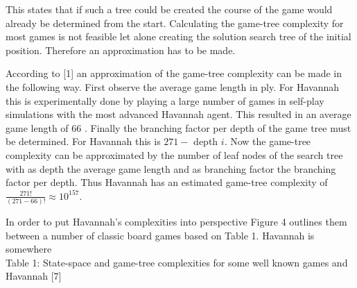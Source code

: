 \documentclass[10pt]{article}
\begin{document}
This states that if such a tree could be created the course of the game would already be determined from the start. Calculating the game-tree complexity for most games is not feasible let alone creating the solution search tree of the initial position. Therefore an approximation has to be made.

According to [1] an approximation of the game-tree complexity can be made in the following way. First observe the average game length in ply. For Havannah this is experimentally done by playing a large number of games in self-play simulations with the most advanced Havannah agent. This resulted in an average game length of 66 . Finally the branching factor per depth of the game tree must be determined. For Havannah this is $271-$ depth $i$. Now the game-tree complexity can be approximated by the number of leaf nodes of the search tree with as depth the average game length and as branching factor the branching factor per depth. Thus Havannah has an estimated game-tree complexity of $\frac{271!}{(271-66)!} \approx 10^{157}$.

In order to put Havannah's complexities into perspective Figure 4 outlines them between a number of classic board games based on Table 1. Havannah is somewhere\\
Table 1: State-space and game-tree complexities for some well known games and Havannah [7]
\end{document}
